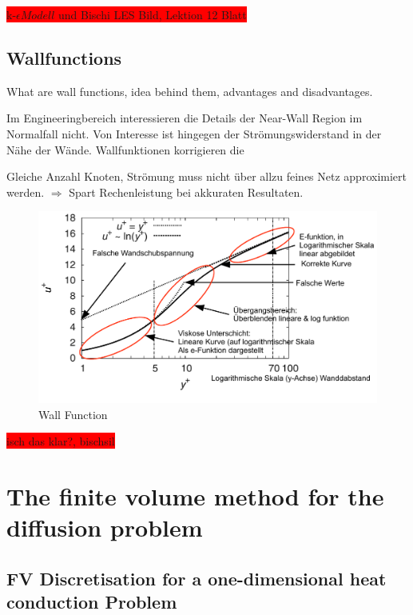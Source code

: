 \documentclass[a4paper]{scrartcl}
\begin{document}
\colorbox{red}{k-$\epsilon Modell$ und Bischi LES Bild, Lektion 12 Blatt}


\subsection{Wallfunctions} 
What are wall functions, idea behind them, advantages
and disadvantages.

Im Engineeringbereich interessieren die Details der Near-Wall Region im
Normalfall nicht. Von Interesse ist hingegen der Strömungswiderstand in der Nähe
der Wände. Wallfunktionen korrigieren die

Gleiche Anzahl Knoten, Strömung muss nicht über allzu feines Netz approximiert
werden. $\Rightarrow$ Spart Rechenleistung bei akkuraten Resultaten.\\
\begin{figure}[h!]
\begin{center}
\includegraphics[scale=0.8]{images/wall_function.pdf}
\caption{Wall Function}
\label{fig:Wall}
\end{center}
\end{figure}


\colorbox{red}{isch das klar?, bischsil}

\section{The finite volume method for the diffusion problem}


\subsection{FV Discretisation for a one-dimensional heat conduction Problem}
\end{document}
